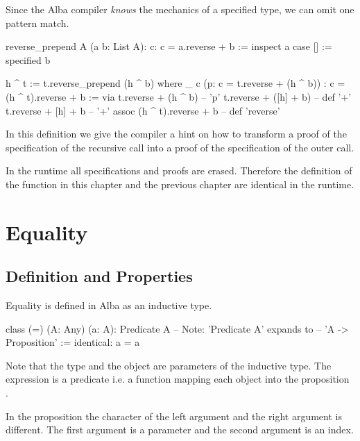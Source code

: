 Since the Alba compiler \emph{knows} the mechanics of a specified type, we can
omit one pattern match.

\begin{alba}
  reverse_prepend A (a b: List A): {c: c = a.reverse + b} :=
    inspect a case
      [] :=
        specified b

      h ^ t :=
        t.reverse_prepend (h ^ b) where
          _ c (p: c = t.reverse + (h ^ b))
            : c = (h ^ t).reverse + b :=
             via t.reverse + (h ^ b)      -- 'p'
                 t.reverse + ([h] + b)    -- def '+'
                 t.reverse + [h] + b      -- '+' assoc
                 (h ^ t).reverse + b      -- def 'reverse'
\end{alba}

In this definition we give the compiler a hint on how to transform a proof of
the specification of the recursive call into a proof of the specification of
the outer call.

In the runtime all specifications and proofs are erased. Therefore the
definition of the function  in this chapter and the
previous chapter are identical in the runtime.








\section{Equality}



\subsection{Definition and Properties}

Equality is defined in Alba as an inductive type.
\begin{alba}
    class
        (=) (A: Any) (a: A): Predicate A
            -- Note: 'Predicate A' expands to
            --       'A -> Proposition'
    :=
        identical: a = a
\end{alba}

Note that the type  and the object  are parameters of the
inductive type. The expression  is a predicate i.e. a function
 mapping each object  into the
proposition .

In the proposition  the character of the left argument  and
the right argument  is different. The first argument is a parameter and
the second argument is an index.

